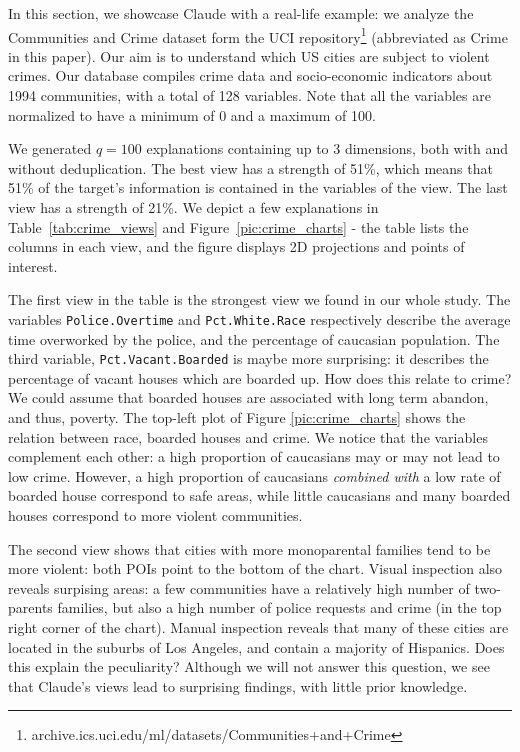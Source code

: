In this section, we showcase Claude with a real-life example: we analyze the
Communities and Crime dataset form the UCI
repository\footnote{archive.ics.uci.edu/ml/datasets/Communities+and+Crime}
(abbreviated as Crime in this paper). Our aim is to understand which US cities
are subject to violent crimes. Our database compiles crime data and
socio-economic indicators about 1994 communities, with a total of 128
variables. Note that all the variables are normalized to have a minimum of 0
and a maximum of 100.

We generated $q=100$ explanations containing up to 3 dimensions, both with and
without deduplication. The best view has a strength of 51\%, which means that
51\% of the target's information is contained in the variables of the view. The
last view has a strength of 21\%. We depict a few explanations in
Table~\ref{tab:crime_views} and Figure~\ref{pic:crime_charts} - the table lists
the columns in each view, and the figure displays 2D projections and points of
interest.

The first view in the table is the strongest view we found in our
whole study.  The variables \texttt{Police.Overtime} and
\texttt{Pct.White.Race} respectively describe the average time overworked by
the police, and the percentage of caucasian population. The third variable,
\texttt{Pct.Vacant.Boarded} is maybe more surprising: it describes the
percentage of vacant houses which are boarded up. How does this relate to
crime? We could assume that boarded houses are associated with long term
abandon, and thus, poverty. The top-left plot of Figure \ref{pic:crime_charts}
shows the relation between race, boarded houses and crime. We notice that the
variables complement each other: a high proportion of caucasians may or may not
lead to low crime. However,  a high proportion of caucasians \emph{combined
with} a low rate of boarded house correspond to safe areas, while little
caucasians and many boarded houses correspond to more violent communities.

The second view shows that cities with more monoparental families tend to be
more violent: both POIs point to the bottom of the chart. Visual inspection
also reveals surpising areas: a few communities have a relatively high number
of two-parents families, but also a high number of police requests and crime (in the
top right corner of the chart). Manual inspection reveals that many of these
cities are located in the suburbs of Los Angeles, and contain a majority of
Hispanics. Does this explain the peculiarity? Although we will not answer this
question, we see that Claude's views lead to surprising findings, with little
prior knowledge.

